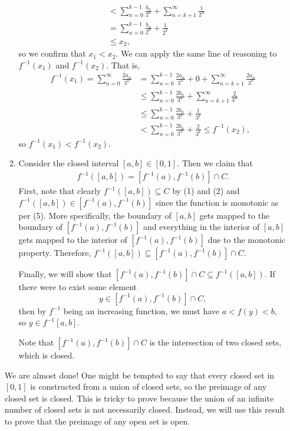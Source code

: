 \documentclass{article}
\numberwithin{equation}{section}
\begin{document}
\begin{enumerate}
\begin{enumerate}[label=Proof of (\arabic*)]
\begin{align}
            &< \sum_{n=0}^{k-1}\frac{b_n}{2^n} + \sum_{n=k+1}^{\infty}\frac{1}{2^n} \\
            &= \sum_{n=0}^{k-1}\frac{b_n}{2^n} + \frac{1}{2^k} \\
            &\le x_2,
        \end{align}
        so we confirm that $x_1< x_2.$ We can apply the same line of reasoning to $f^{-1}(x_1)$ and $f^{-1}(x_2).$ That is, 
        \begin{align}
            f^{-1}(x_1) = \sum_{n=0}^{\infty} \frac{2a_n}{3^n} &= \sum_{n=0}^{k-1}\frac{2a_n}{3^n} + 0 + \sum_{n=k+1}^{\infty}\frac{2a_n}{3^n} \\ 
            &\le \sum_{n=0}^{k-1}\frac{2b_n}{3^n} + \sum_{n=k+1}^{\infty}\frac{2}{3^n} \\ 
            &\le \sum_{n=0}^{k-1}\frac{2b_n}{3^n} + \frac{1}{3^k} \\
            &< \sum_{n=0}^{k-1}\frac{2b_n}{3^n} + \frac{2}{3^k} \le f^{-1}(x_2),
        \end{align}
        so $f^{-1}(x_1) < f^{-1}(x_2).$
        \item Consider the closed interval $[a,b]\in [0,1].$ Then we claim that 
        \begin{align}
            f^{-1}([a,b]) = [f^{-1}(a), f^{-1}(b)] \cap C.
        \end{align}
        First, note that clearly $f^{-1}([a,b]) \subseteq C$ by (1) and (2) and $f^{-1}([a,b]) \in [f^{-1}(a), f^{-1}(b)]$ since the function is monotonic as per (5). More specifically, the boundary of $[a,b]$ gets mapped to the boundary of $[f^{-1}(a), f^{-1}(b)]$ and everything in the interior of $[a,b]$ gets mapped to the interior of $[f^{-1}(a), f^{-1}(b)]$ due to the monotonic property. Therefore, $f^{-1}([a,b]) \subseteq [f^{-1}(a), f^{-1}(b)] \cap C.$

        Finally, we will show that $[f^{-1}(a), f^{-1}(b)] \cap C \subseteq f^{-1}([a,b]).$ If there were to exist some element $$y\in [f^{-1}(a), f^{-1}(b)] \cap C,$$ then by $f^{-1}$ being an increasing function, we must have $a<f(y)<b,$ so $y \in f^{-1}[a,b].$ 

        Note that $[f^{-1}(a), f^{-1}(b)] \cap C$ is the intersection of two closed sets, which is closed.
    \end{enumerate}
    We are almost done! One might be tempted to say that every closed set in $[0,1]$ is constructed from a union of closed sets, so the preimage of any closed set is closed. This is tricky to prove because the union of an infinite number of closed sets is not necessarily closed. Instead, we will use this result to prove that the preimage of any open set is open.
    

\end{enumerate}
\end{document}
